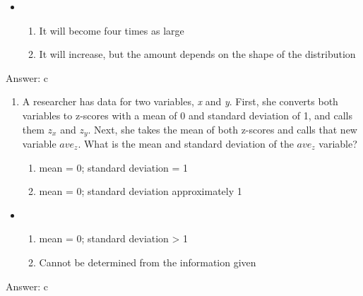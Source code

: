 \documentclass[]{article}
\providecommand{\tightlist}{%
  \setlength{\itemsep}{0pt}\setlength{\parskip}{0pt}}
\begin{document}
\begin{itemize}
\item
  \begin{enumerate}
  \def\labelenumi{\alph{enumi}.}
  \setcounter{enumi}{2}
  \tightlist
  \item
    It will become four times as large
  \item
    It will increase, but the amount depends on the shape of the
    distribution
  \end{enumerate}
\end{itemize}

Answer: c

\begin{enumerate}
\def\labelenumi{\arabic{enumi}.}
\setcounter{enumi}{17}
\item
  A researcher has data for two variables, \emph{x} and \emph{y}. First,
  she converts both variables to z-scores with a mean of 0 and standard
  deviation of 1, and calls them \(z_x\) and \(z_y\). Next, she takes
  the mean of both z-scores and calls that new variable \(ave_z\). What
  is the mean and standard deviation of the \(ave_z\) variable?

  \begin{enumerate}
  \def\labelenumii{\alph{enumii}.}
  \tightlist
  \item
    mean = 0; standard deviation = 1
  \item
    mean = 0; standard deviation approximately 1
  \end{enumerate}
\end{enumerate}

\begin{itemize}
\item
  \begin{enumerate}
  \def\labelenumi{\alph{enumi}.}
  \setcounter{enumi}{2}
  \tightlist
  \item
    mean = 0; standard deviation \textgreater{} 1
  \item
    Cannot be determined from the information given
  \end{enumerate}
\end{itemize}

Answer: c
\end{document}

